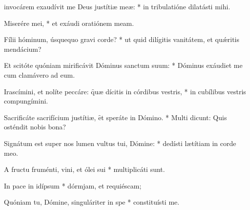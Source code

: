 \begin{psalmus}

     invocárem exaudívit me Deus justítiæ meæ: * in tribulatióne dilatásti mihi.

    Miserére mei, * et exáudi oratiónem meam.

    Fílii hóminum, úsquequo gravi corde? * ut quid dilígitis vanitátem, et quǽritis mendácium?

    Et scitóte quóniam mirificávit Dóminus sanctum suum: * Dóminus exáudiet me cum clamávero ad eum.

    Irascímini, et nolíte peccáre: \f quæ dícitis in córdibus vestris, * in cubílibus vestris compungímini.

    Sacrificáte sacrifícium justítiæ, \f et speráte in Dómino. * Multi dicunt: Quis osténdit nobis bona?

    Signátum est super nos lumen vultus tui, Dómine: * dedísti lætítiam in corde meo.

    A fructu fruménti, vini, et ólei sui * multiplicáti sunt.

    In pace in idípsum * dórmjam, et requiéscam;

    Quóniam tu, Dómine, singuláriter in spe * constituísti me.

\end{psalmus}
